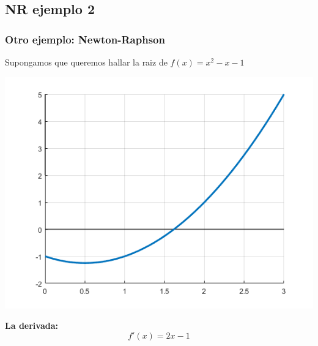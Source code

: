 \documentclass[xcolor=svgnames]{beamer} %
\theoremstyle{plain}
\renewcommand{\textbf}[1]{{\bfseries\textcolor{redUnq2}{#1}}}
\theoremstyle{definition}
\begin{document}
\subsection{NR ejemplo 2}

\begin{frame}
\frametitle{Otro ejemplo: Newton-Raphson}

Supongamos que queremos hallar la raiz de $f(x) = x^2-x-1$



\begin{minipage}{.7\linewidth}
\includegraphics[width=\linewidth]{fp_example2/f.png} 

\end{minipage} \begin{minipage}{.25\linewidth}
\textbf{La derivada:}
$$ f'(x) = 2x -1$$ 
\end{minipage}

\end{frame}
\end{document}
